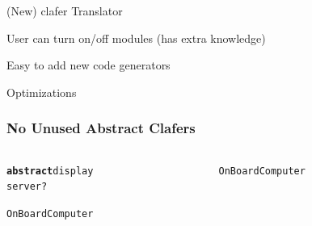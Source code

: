 \documentclass[table,15pt,t]{beamer}
\newcommand{\vmiddle}[1]{
  \vspace{\stretch{1}}
  #1
  \vspace{\stretch{1}}
}
\newcommand{\interframe}[1]{
\begin{frame}{}
\vmiddle{\hmiddle{\Huge #1}}
\end{frame}
}
\newcommand{\mlist}[1]{
\vmiddle{
  \begin{list}{}{}
    #1
  \end{list}
  }
}
\newcommand{\hmiddle}[1]{
  \begin{center}#1\end{center}
}
\newcounter{i}
\begin{document}
\begin{frame}{(New) clafer Translator}

 \mlist{
    \item User can turn on/off modules (has extra knowledge)
    \item Easy to add new code generators
 }
\end{frame}

\interframe{Optimizations}

\begin{frame}[fragile]
  \frametitle{No Unused Abstract Clafers}
  \begin{columns}
    \begin{column}{0.5\textwidth}
      \begin{alltt}
        \begin{small}
\textbf{abstract} \textsf{display}
  \textsf{server} ?

\textsf{OnBoardComputer}
        \end{small}
      \end{alltt}
    \end{column}
\pause
    \begin{column}{0.5\textwidth}
      \begin{alltt}
        \begin{small}
\textsf{OnBoardComputer}
        \end{small}
      \end{alltt}
    \end{column}
  \end{columns}
\end{frame}
\end{document}
